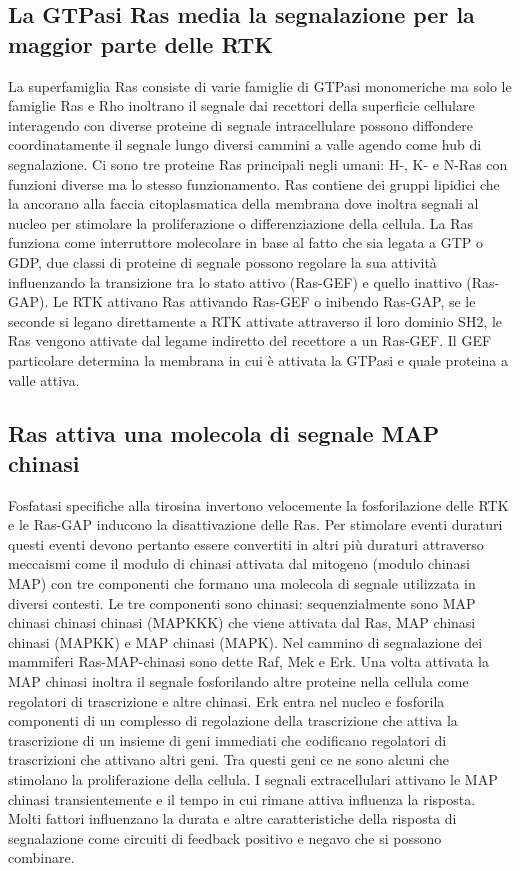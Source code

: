 \subsection{La GTPasi Ras media la segnalazione per la maggior parte delle RTK}
La superfamiglia Ras consiste di varie famiglie di GTPasi monomeriche ma solo le famiglie Ras e Rho inoltrano il segnale dai recettori della superficie cellulare interagendo con 
diverse proteine di segnale intracellulare possono diffondere coordinatamente il segnale lungo diversi cammini a valle agendo come hub di segnalazione. Ci sono tre proteine Ras 
principali negli umani: H-, K- e N-Ras con funzioni diverse ma lo stesso funzionamento. Ras contiene dei gruppi lipidici che la ancorano alla faccia citoplasmatica della membrana dove
inoltra segnali al nucleo per stimolare la proliferazione o differenziazione della cellula. La Ras funziona come interruttore molecolare in base al fatto che sia legata a GTP o GDP, due
classi di proteine di segnale possono regolare la sua attivit\`a influenzando la transizione tra lo stato attivo (Ras-GEF) e quello inattivo (Ras-GAP). Le RTK attivano Ras attivando 
Ras-GEF o inibendo Ras-GAP, se le seconde si legano direttamente a RTK attivate attraverso il loro dominio SH2, le Ras vengono attivate dal legame indiretto del recettore a un Ras-GEF. 
Il GEF particolare determina la membrana in cui \`e attivata la GTPasi e quale proteina a valle attiva. 
\subsection{Ras attiva una molecola di segnale MAP chinasi}
Fosfatasi specifiche alla tirosina invertono velocemente la fosforilazione delle RTK e le Ras-GAP inducono la disattivazione delle Ras. Per stimolare eventi duraturi questi eventi 
devono pertanto essere convertiti in altri pi\`u duraturi attraverso meccaismi come il modulo di chinasi attivata dal mitogeno (modulo chinasi MAP) con tre componenti che formano una
molecola di segnale utilizzata in diversi contesti. Le tre componenti sono chinasi: sequenzialmente sono MAP chinasi chinasi chinasi (MAPKKK) che viene attivata dal Ras, MAP chinasi
chinasi (MAPKK) e MAP chinasi (MAPK). Nel cammino di segnalazione dei mammiferi Ras-MAP-chinasi sono dette Raf, Mek e Erk. Una volta attivata la MAP chinasi inoltra il segnale 
fosforilando altre proteine nella cellula come regolatori di trascrizione e altre chinasi. Erk entra nel nucleo e fosforila componenti di un complesso di regolazione della trascrizione
che attiva la trascrizione di un insieme di geni immediati che codificano regolatori di trascrizioni che attivano altri geni. Tra questi geni ce ne sono alcuni che stimolano la 
proliferazione della cellula. I segnali extracellulari attivano le MAP chinasi transientemente e il tempo in cui rimane attiva influenza la risposta. Molti fattori influenzano la durata
e altre caratteristiche della risposta di segnalazione come circuiti di feedback positivo e negavo che si possono combinare. 
